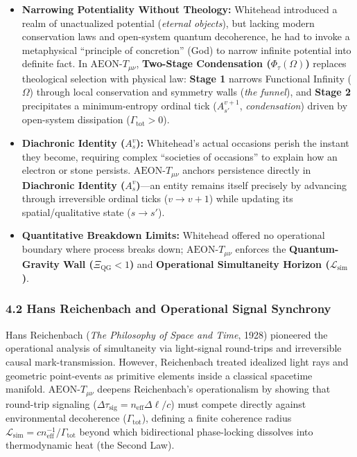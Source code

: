 \documentclass[
]{article}
\providecommand{\tightlist}{%
  \setlength{\itemsep}{0pt}\setlength{\parskip}{0pt}}
\begin{document}
\begin{itemize}
\tightlist
\item
  \textbf{Narrowing Potentiality Without Theology:} Whitehead introduced
  a realm of unactualized potential (\emph{eternal objects}), but
  lacking modern conservation laws and open-system quantum decoherence,
  he had to invoke a metaphysical ``principle of concretion'' (God) to
  narrow infinite potential into definite fact. In
  \(\text{AEON-}T_{\mu\nu}\), \textbf{Two-Stage Condensation
  (\(\Phi_\tau(\Omega)\))} replaces theological selection with physical
  law: \textbf{Stage 1} narrows Functional Infinity (\(\Omega\)) through
  local conservation and symmetry walls (\emph{the funnel}), and
  \textbf{Stage 2} precipitates a minimum-entropy ordinal tick
  (\(A_{s'}^{v+1}\), \emph{condensation}) driven by open-system
  dissipation (\(\Gamma_{\mathrm{tot}} > 0\)).
\item
  \textbf{Diachronic Identity (\(A_s^v\)):} Whitehead's actual occasions
  perish the instant they become, requiring complex ``societies of
  occasions'' to explain how an electron or stone persists.
  \(\text{AEON-}T_{\mu\nu}\) anchors persistence directly in
  \textbf{Diachronic Identity (\(A_s^v\))}---an entity remains itself
  precisely by advancing through irreversible ordinal ticks
  (\(v \to v + 1\)) while updating its spatial/qualitative state
  (\(s \to s'\)).
\item
  \textbf{Quantitative Breakdown Limits:} Whitehead offered no
  operational boundary where process breaks down;
  \(\text{AEON-}T_{\mu\nu}\) enforces the \textbf{Quantum-Gravity Wall
  (\(\Xi_{\mathrm{QG}} < 1\))} and \textbf{Operational Simultaneity
  Horizon (\(\mathcal{L}_{\mathrm{sim}}\))}.
\end{itemize}

\subsubsection{4.2 Hans Reichenbach and Operational Signal
Synchrony}\label{hans-reichenbach-and-operational-signal-synchrony}

Hans Reichenbach (\emph{The Philosophy of Space and Time}, 1928)
pioneered the operational analysis of simultaneity via light-signal
round-trips and irreversible causal mark-transmission. However,
Reichenbach treated idealized light rays and geometric point-events as
primitive elements inside a classical spacetime manifold.
\(\text{AEON-}T_{\mu\nu}\) deepens Reichenbach's operationalism by
showing that round-trip signaling
(\(\Delta\tau_{\mathrm{sig}} = n_{\mathrm{eff}} \Delta\ell / c\)) must
compete directly against environmental decoherence
(\(\Gamma_{\mathrm{tot}}\)), defining a finite coherence radius
\(\mathcal{L}_{\mathrm{sim}} = c n_{\mathrm{eff}}^{-1} / \Gamma_{\mathrm{tot}}\)
beyond which bidirectional phase-locking dissolves into thermodynamic
heat (the Second Law).
\end{document}

